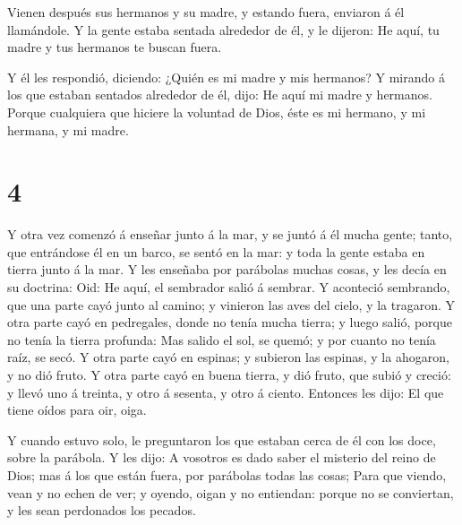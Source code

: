  Vienen después sus hermanos y su madre, y estando fuera,
enviaron á él llamándole.  Y la gente estaba sentada
alrededor de él, y le dijeron: He aquí, tu madre y tus hermanos te
buscan fuera.

 Y él les respondió, diciendo: ¿Quién es mi madre y mis
hermanos?  Y mirando á los que estaban sentados alrededor
de él, dijo: He aquí mi madre y hermanos.  Porque
cualquiera que hiciere la voluntad de Dios, éste es mi hermano, y mi
hermana, y mi madre.

\hypertarget{section-3}{%
\section{4}\label{section-3}}

 Y otra vez comenzó á enseñar junto á la mar, y se juntó á
él mucha gente; tanto, que entrándose él en un barco, se sentó en la
mar: y toda la gente estaba en tierra junto á la mar.  Y les
enseñaba por parábolas muchas cosas, y les decía en su doctrina:
 Oid: He aquí, el sembrador salió á sembrar.  Y
aconteció sembrando, que una parte cayó junto al camino; y vinieron las
aves del cielo, y la tragaron.  Y otra parte cayó en
pedregales, donde no tenía mucha tierra; y luego salió, porque no tenía
la tierra profunda:  Mas salido el sol, se quemó; y por
cuanto no tenía raíz, se secó.  Y otra parte cayó en
espinas; y subieron las espinas, y la ahogaron, y no dió fruto.
 Y otra parte cayó en buena tierra, y dió fruto, que subió y
creció: y llevó uno á treinta, y otro á sesenta, y otro á ciento.
 Entonces les dijo: El que tiene oídos para oir, oiga.

 Y cuando estuvo solo, le preguntaron los que estaban cerca
de él con los doce, sobre la parábola.  Y les dijo: A
vosotros es dado saber el misterio del reino de Dios; mas á los que
están fuera, por parábolas todas las cosas;  Para que
viendo, vean y no echen de ver; y oyendo, oigan y no entiendan: porque
no se conviertan, y les sean perdonados los pecados.

